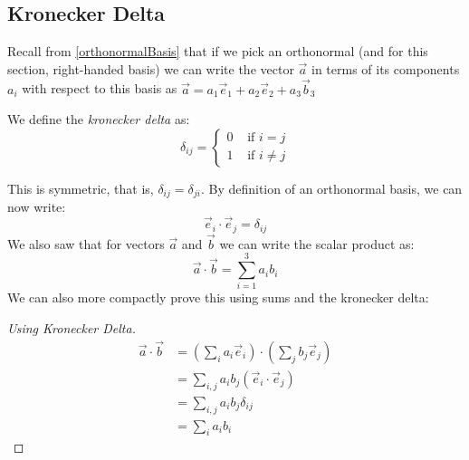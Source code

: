 \documentclass[../main.tex]{subfiles}
\begin{document}
\subsection{Kronecker Delta}
\begin{remark}[Recap]
  Recall from \cref{orthonormalBasis} that if we pick an orthonormal (and for this section, right-handed basis) we can write the vector $\vec{a}$ in terms of its components $a_i$ with respect to this basis as $\vec{a} = a_1 \vec{e}_1 + a_2 \vec{e}_2 + a_3 \vec{b}_3$
\end{remark}
\begin{definition}
  We define the \textit{kronecker delta} as:
  \[
    \delta_{i j} = \begin{cases}
    0 & \text{ if } i = j \\
    1 & \text{ if } i \neq j
    \end{cases}
  \]
\end{definition}
This is symmetric, that is, $\delta_{i j} = \delta_{j i}$.
By definition of an orthonormal basis, we can now write:
\[
  \vec{e}_i \cdot \vec{e}_j = \delta_{i j}
\]
We also saw that for vectors $\vec{a}$ and $\vec{b}$ we can write the scalar product as:
\[
  \vec{a} \cdot \vec{b} = \sum_{i=1}^{3} a_i b_i
\]
We can also more compactly prove this using sums and the kronecker delta:
\begin{proof}[Using Kronecker Delta]
  \begin{align*}
    \vec{a} \cdot \vec{b} &= \left(\sum_i a_i \vec{e}_i\right) \cdot \left(\sum_j b_j \vec{e}_j\right) \\
                          &= \sum_{i,j} a_i b_j (\vec{e}_i \cdot \vec{e}_j) \\
                          &= \sum_{i,j} a_i b_j \delta_{i j} \\
                          &= \sum_i a_i b_i
  \end{align*}
\end{proof}
\end{document}
